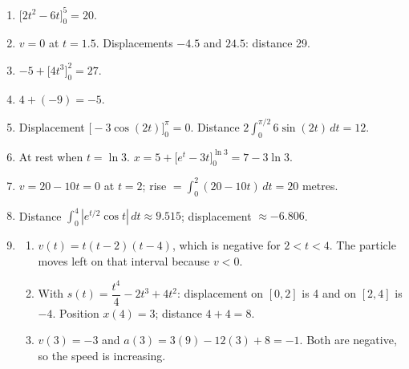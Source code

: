 \documentclass[11pt]{article}
\begin{document}
\newpage
\begin{solbox}
\begin{enumerate}[leftmargin=*,itemsep=4pt]
  \item $\Big[2t^2-6t\Big]_0^5=20$.
  \item $v=0$ at $t=1.5$. Displacements $-4.5$ and $24.5$: distance 29.
  \item $-5+\Big[4t^3\Big]_0^2=27$.
  \item $4+(-9)=-5$.
  \item Displacement $\Big[-3\cos(2t)\Big]_0^{\pi}=0$. Distance $2\displaystyle\int_{0}^{\pi/2}6\sin(2t)\,dt=12$.
  \item At rest when $t=\ln3$. $x=5+\Big[e^{t}-3t\Big]_0^{\ln3}=7-3\ln3$.
  \item $v=20-10t=0$ at $t=2$; rise $=\displaystyle\int_{0}^{2}(20-10t)\,dt=20$ metres.
  \item Distance $\displaystyle\int_{0}^{4}\left|e^{t/2}\cos t\right|\,dt\approx9.515$; displacement $\approx-6.806$.
  \item \begin{enumerate}[label=(\alph*),leftmargin=*,itemsep=3pt]
    \item $v(t)=t(t-2)(t-4)$, which is negative for $2<t<4$. The particle moves left on that interval because $v<0$.
    \item With $s(t)=\dfrac{t^4}{4}-2t^3+4t^2$: displacement on $[0,2]$ is 4 and on $[2,4]$ is $-4$. Position $x(4)=3$; distance $4+4=8$.
    \item $v(3)=-3$ and $a(3)=3(9)-12(3)+8=-1$. Both are negative, so the speed is increasing.
  \end{enumerate}
\end{enumerate}
\end{solbox}
\end{document}
